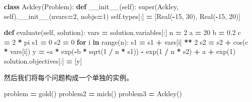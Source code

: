 \documentclass[]{ctexbook}
\newenvironment{Shaded}{\begin{snugshade}}{\end{snugshade}}
\newcommand{\KeywordTok}[1]{\textcolor[rgb]{0.13,0.29,0.53}{\textbf{#1}}}
\newcommand{\DecValTok}[1]{\textcolor[rgb]{0.00,0.00,0.81}{#1}}
\newcommand{\FloatTok}[1]{\textcolor[rgb]{0.00,0.00,0.81}{#1}}
\newcommand{\FunctionTok}[1]{\textcolor[rgb]{0.00,0.00,0.00}{#1}}
\newcommand{\VariableTok}[1]{\textcolor[rgb]{0.00,0.00,0.00}{#1}}
\newcommand{\ControlFlowTok}[1]{\textcolor[rgb]{0.13,0.29,0.53}{\textbf{#1}}}
\newcommand{\OperatorTok}[1]{\textcolor[rgb]{0.81,0.36,0.00}{\textbf{#1}}}
\newcommand{\BuiltInTok}[1]{#1}
\newcommand{\NormalTok}[1]{#1}
\begin{document}
\begin{Shaded}
\begin{Highlighting}[]
\KeywordTok{class}\NormalTok{ Ackley(Problem):}
    \KeywordTok{def} \FunctionTok{__init__}\NormalTok{(}\VariableTok{self}\NormalTok{):}
        \BuiltInTok{super}\NormalTok{(Ackley, }\VariableTok{self}\NormalTok{).}\FunctionTok{__init__}\NormalTok{(nvars}\OperatorTok{=}\DecValTok{2}\NormalTok{, nobjs}\OperatorTok{=}\DecValTok{1}\NormalTok{)}
        \VariableTok{self}\NormalTok{.types[:] }\OperatorTok{=}\NormalTok{ [Real(}\OperatorTok{-}\DecValTok{15}\NormalTok{, }\DecValTok{30}\NormalTok{), Real(}\OperatorTok{-}\DecValTok{15}\NormalTok{, }\DecValTok{20}\NormalTok{)]}

    \KeywordTok{def}\NormalTok{ evaluate(}\VariableTok{self}\NormalTok{, solution):}
        \BuiltInTok{vars} \OperatorTok{=}\NormalTok{ solution.variables[:]}
\NormalTok{        n }\OperatorTok{=} \DecValTok{2}
\NormalTok{        a }\OperatorTok{=} \DecValTok{20}
\NormalTok{        b }\OperatorTok{=} \FloatTok{0.2}
\NormalTok{        c }\OperatorTok{=} \DecValTok{2} \OperatorTok{*}\NormalTok{ pi}
\NormalTok{        s1 }\OperatorTok{=} \DecValTok{0}
\NormalTok{        s2 }\OperatorTok{=} \DecValTok{0}
        \ControlFlowTok{for}\NormalTok{ i }\KeywordTok{in} \BuiltInTok{range}\NormalTok{(n):}
\NormalTok{            s1 }\OperatorTok{=}\NormalTok{ s1 }\OperatorTok{+} \BuiltInTok{vars}\NormalTok{[i] }\OperatorTok{**} \DecValTok{2}
\NormalTok{            s2 }\OperatorTok{=}\NormalTok{ s2 }\OperatorTok{+}\NormalTok{ cos(c }\OperatorTok{*} \BuiltInTok{vars}\NormalTok{[i])}
\NormalTok{        y }\OperatorTok{=} \OperatorTok{-}\NormalTok{a }\OperatorTok{*}\NormalTok{ exp(}\OperatorTok{-}\NormalTok{b }\OperatorTok{*}\NormalTok{ sqrt(}\DecValTok{1} \OperatorTok{/}\NormalTok{ n }\OperatorTok{*}\NormalTok{ s1)) }\OperatorTok{-}\NormalTok{ exp(}\DecValTok{1} \OperatorTok{/}\NormalTok{ n }\OperatorTok{*}\NormalTok{ s2) }\OperatorTok{+}\NormalTok{ a }\OperatorTok{+}\NormalTok{ exp(}\DecValTok{1}\NormalTok{)}
\NormalTok{        solution.objectives[:] }\OperatorTok{=}\NormalTok{ [y]}
        
\end{Highlighting}
\end{Shaded}

然后我们将每个问题构成一个单独的实例。

\begin{Shaded}
\begin{Highlighting}[]
\NormalTok{problem }\OperatorTok{=}\NormalTok{ gold()}
\NormalTok{problem2 }\OperatorTok{=}\NormalTok{ mich()}
\NormalTok{problem3 }\OperatorTok{=}\NormalTok{ Ackley()}
\end{Highlighting}
\end{Shaded}
\end{document}
